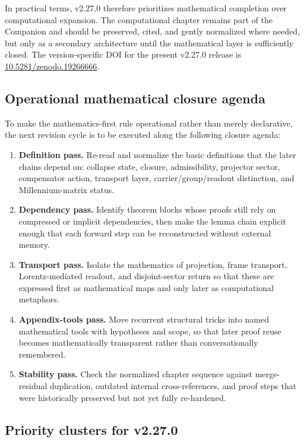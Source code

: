 In practical terms, v2.27.0 therefore prioritizes mathematical completion over computational expansion. The computational chapter remains part of the Companion and should be preserved, cited, and gently normalized where needed, but only as a secondary architecture until the mathematical layer is sufficiently closed. The version-specific DOI for the present v2.27.0 release is \href{https://doi.org/10.5281/zenodo.19266666}{10.5281/zenodo.19266666}.


\subsection*{Operational mathematical closure agenda}

To make the mathematics-first rule operational rather than merely declarative, the next revision cycle is to be executed along the following closure agenda:
\begin{enumerate}[leftmargin=2em,label=\textbf{MA\arabic*:}]
  \item \textbf{Definition pass.} Re-read and normalize the basic definitions that the later chains depend on: collapse state, closure, admissibility, projector sector, compensator action, transport layer, carrier/group/readout distinction, and Millennium-matrix status.
  \item \textbf{Dependency pass.} Identify theorem blocks whose proofs still rely on compressed or implicit dependencies, then make the lemma chain explicit enough that each forward step can be reconstructed without external memory.
  \item \textbf{Transport pass.} Isolate the mathematics of projection, frame transport, Lorentz-mediated readout, and disjoint-sector return so that these are expressed first as mathematical maps and only later as computational metaphors.
  \item \textbf{Appendix-tools pass.} Move recurrent structural tricks into named mathematical tools with hypotheses and scope, so that later proof reuse becomes mathematically transparent rather than conversationally remembered.
  \item \textbf{Stability pass.} Check the normalized chapter sequence against merge-residual duplication, outdated internal cross-references, and proof steps that were historically preserved but not yet fully re-hardened.
\end{enumerate}

\subsection*{Priority clusters for v2.27.0}

